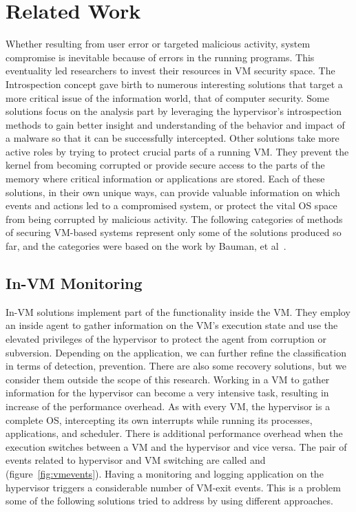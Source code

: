\section{Related Work}\label{sec:related}

\par Whether resulting from user error or targeted malicious activity, system compromise is inevitable because of errors in the running programs. This eventuality led researchers to invest their resources in \ac{VM} security space. The Introspection concept gave birth to numerous interesting solutions that target a more critical issue of the information world, that of computer security. Some solutions focus on the analysis part by leveraging the hypervisor's introspection methods to gain better insight and understanding of the behavior and impact of a malware so that it can be successfully intercepted. Other solutions take more active roles by trying to protect crucial parts of a running \ac{VM}. They prevent the kernel from becoming corrupted or provide secure access to the parts of the memory where critical information or applications are stored. 
Each of these solutions, in their own unique ways, can provide valuable information on which events and actions led to a compromised system, or protect the vital \ac{OS} space from being corrupted by malicious activity. 
The following categories of methods of securing \ac{VM}-based systems represent only some of the solutions produced so far, and the categories were based on the work by Bauman, et al~\cite{bauman2015survey}.

\subsection{In-\ac{VM} Monitoring}\label{sub:invm}
In-\ac{VM} solutions implement part of the functionality inside the \ac{VM}. They employ an inside agent to gather information on the \ac{VM}'s execution state and use the elevated privileges of the hypervisor to protect the agent from corruption or subversion. Depending on the application, we can further refine the classification in terms of detection, prevention. There are also some recovery solutions, but we consider them outside the scope of this research. Working in a \ac{VM} to gather information for the hypervisor can become a very intensive task, resulting in increase of the performance overhead. As with every \ac{VM}, the hypervisor is a complete \ac{OS}, intercepting its own interrupts while running its processes, applications, and scheduler. There is additional performance overhead when the execution switches between a \ac{VM} and the hypervisor and vice versa. The pair of events related to hypervisor and \ac{VM} switching are called  and  (figure~\ref{fig:vmevents}). Having a monitoring and logging application on the hypervisor triggers a considerable number of VM-exit events. This is a problem some of the following solutions tried to address by using different approaches.

